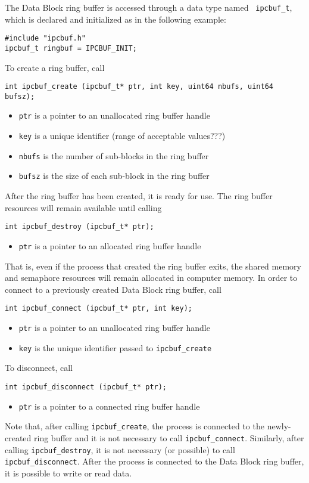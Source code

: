 The Data Block ring buffer is accessed through a data type named {\tt
ipcbuf\_t}, which is declared and initialized as in the following
example:
\begin{verbatim}
#include "ipcbuf.h"
ipcbuf_t ringbuf = IPCBUF_INIT;
\end{verbatim}
To create a ring buffer, call
\begin{verbatim}
int ipcbuf_create (ipcbuf_t* ptr, int key, uint64 nbufs, uint64 bufsz);
\end{verbatim}
\vspace{-3mm}
\begin{itemize}
\item {\tt ptr} is a pointer to an unallocated ring buffer handle
\item {\tt key} is a unique identifier (range of acceptable values???)
\item {\tt nbufs} is the number of sub-blocks in the ring buffer
\item {\tt bufsz} is the size of each sub-block in the ring buffer
\end{itemize}
After the ring buffer has been created, it is ready for use.   The ring
buffer resources will remain available until calling
\begin{verbatim}
int ipcbuf_destroy (ipcbuf_t* ptr);
\end{verbatim}
\vspace{-3mm}
\begin{itemize}
\item {\tt ptr} is a pointer to an allocated ring buffer handle
\end{itemize}
That is, even if the process that created the ring buffer exits, the
shared memory and semaphore resources will remain allocated in
computer memory.  In order to connect to a previously created Data
Block ring buffer, call
\begin{verbatim}
int ipcbuf_connect (ipcbuf_t* ptr, int key);
\end{verbatim}
\vspace{-3mm}
\begin{itemize}
\item {\tt ptr} is a pointer to an unallocated ring buffer handle
\item {\tt key} is the unique identifier passed to {\tt ipcbuf\_create}
\end{itemize}

\newpage
\noindent
To disconnect, call
\begin{verbatim}
int ipcbuf_disconnect (ipcbuf_t* ptr);
\end{verbatim}
\vspace{-3mm}
\begin{itemize}
\item {\tt ptr} is a pointer to a connected ring buffer handle
\end{itemize}
Note that, after calling {\tt ipcbuf\_create}, the process is connected
to the newly-created ring buffer and it is not necessary to call 
{\tt ipcbuf\_connect}.  Similarly, after calling {\tt ipcbuf\_destroy},
it is not necessary (or possible) to call {\tt ipcbuf\_disconnect}.
After the process is connected to the Data Block ring buffer, it is
possible to write or read data.

